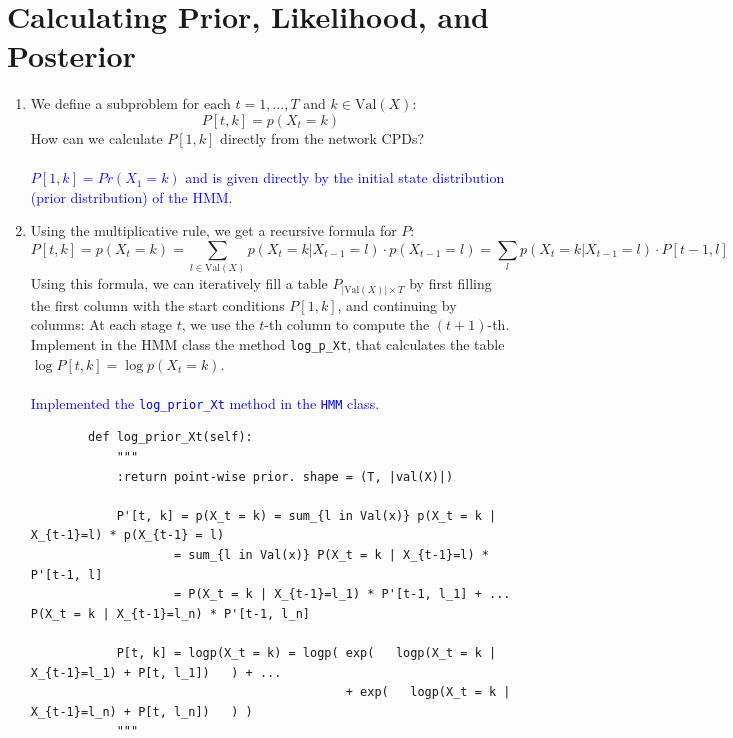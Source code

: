\documentclass[a4 paper]{article}
\begin{document}
\begin{enumerate}
\end{enumerate}

\section{Calculating Prior, Likelihood, and Posterior}

\begin{enumerate}
    \item We define a subproblem for each \( t = 1, \ldots, T \) and \( k \in \text{Val}(X) \):
    \[
    P[t, k] = p(X_t = k)
    \]
    How can we calculate \( P[1, k] \) directly from the network CPDs?
    \\
    \\ \textcolor{blue}{
        $P[1, k] = Pr(X_1 = k)$ and is given directly by the initial state distribution (prior distribution) of the HMM.
    }
    \\

    \item Using the multiplicative rule, we get a recursive formula for \( P \):
    \[
    P[t, k] = p(X_t = k) = \sum_{l \in \text{Val}(X)} p(X_t = k | X_{t-1} = l) \cdot p(X_{t-1} = l) = \sum_{l} p(X_t = k | X_{t-1} = l) \cdot P[t-1, l]
    \]
    Using this formula, we can iteratively fill a table \( P_{|\text{Val}(X)| \times T} \) by first filling the first column with the start conditions \( P[1, k] \), and continuing by columns: At each stage \( t \), we use the \( t \)-th column to compute the \( (t+1) \)-th. Implement in the HMM class the method \texttt{log\_p\_Xt}, that calculates the table \( \log P[t, k] = \log p(X_t = k) \).
    \\
    \\ \textcolor{blue}{
        Implemented the \texttt{log\_prior\_Xt} method in the \texttt{HMM} class.
    }
    \begin{verbatim}
        def log_prior_Xt(self):
            """
            :return point-wise prior. shape = (T, |val(X)|)

            P'[t, k] = p(X_t = k) = sum_{l in Val(x)} p(X_t = k | X_{t-1}=l) * p(X_{t-1} = l)
                    = sum_{l in Val(x)} P(X_t = k | X_{t-1}=l) * P'[t-1, l]
                    = P(X_t = k | X_{t-1}=l_1) * P'[t-1, l_1] + ...  P(X_t = k | X_{t-1}=l_n) * P'[t-1, l_n]

            P[t, k] = logp(X_t = k) = logp( exp(   logp(X_t = k | X_{t-1}=l_1) + P[t, l_1])   ) + ... 
                                            + exp(   logp(X_t = k | X_{t-1}=l_n) + P[t, l_n])   ) )
            """
    \end{verbatim}
    

\end{enumerate}
\end{document}
